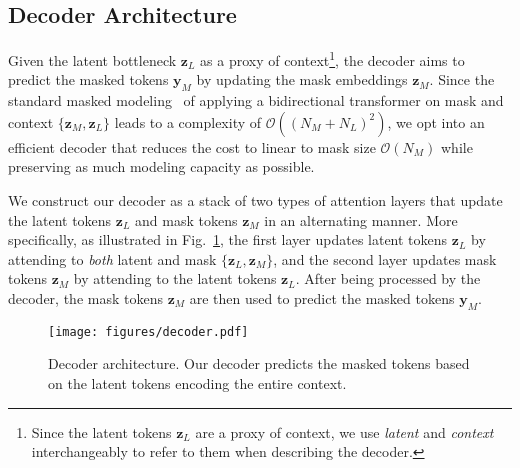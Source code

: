 \documentclass[10pt,twocolumn,letterpaper]{article}
\begin{document}
\subsection{Decoder Architecture}
\label{sec:mebt_decoder}
Given the latent bottleneck $\mathbf{z}_L$ as a proxy of context\footnote{
Since the latent tokens $\mathbf{z}_L$ are a proxy of context, we use \emph{latent} and \emph{context} interchangeably to refer to them when describing the decoder.}, the decoder aims to predict the masked tokens $\mathbf{y}_M$ by updating the mask embeddings $\mathbf{z}_M$.
Since the standard masked modeling~\cite{MaskGIT, BERT, MAE} of applying a bidirectional transformer on mask and context $\{\mathbf{z}_M, \mathbf{z}_L\}$ leads to a complexity of $\mathcal{O}((N_M+N_L)^2)$, we opt into an efficient decoder that reduces the cost to linear to mask size $\mathcal{O}(N_M)$ while preserving as much modeling capacity as possible.



We construct our decoder as a stack of two types of attention layers that update the latent tokens $\mathbf{z}_L$ and mask tokens $\mathbf{z}_M$ in an alternating manner.
More specifically, as illustrated in Fig.~\ref{fig:decoder}, the first layer updates latent tokens $\mathbf{z}_L$ by attending to \emph{both} latent and mask $\{\mathbf{z}_L, \mathbf{z}_M\}$, and the second layer updates mask tokens $\mathbf{z}_M$ by attending to the latent tokens $\mathbf{z}_L$.
After being processed by the decoder, the mask tokens $\mathbf{z}_M$ are then used to predict the masked tokens $\mathbf{y}_M$.

\begin{figure}[t]
    \centering
    \texttt{[image: figures/decoder.pdf]}
    \vspace{-0.3cm}
    \caption{Decoder architecture. Our decoder predicts the masked tokens based on the latent tokens encoding the entire context.}
    \label{fig:decoder}
    \vspace{-0.4cm}
\end{figure}
\end{document}
